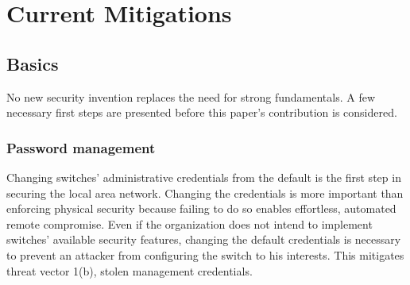 \documentclass[journal]{IEEEtran}
\newcommand{\textbi}[1]{\textbf{\textit{#1}}}
\begin{document}

\section{Current Mitigations}

\subsection{Basics}
No new security invention replaces the need for strong fundamentals. A few necessary first steps
are presented before this paper's contribution is considered.

\subsubsection{Password management}
Changing switches' administrative credentials from the default is the first step in securing the
local area network. Changing the credentials is more important than enforcing physical security
because failing to do so enables effortless, automated remote compromise. Even if the organization
does not intend to implement switches' available security features, changing the default
credentials is necessary to prevent an attacker from configuring the switch to his interests. This
mitigates threat vector 1(b), stolen management credentials.
\end{document}

